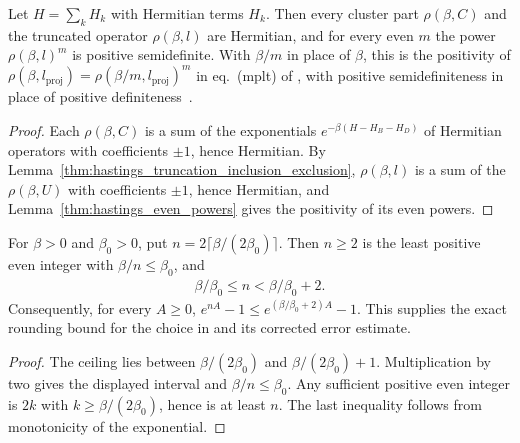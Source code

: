 \begin{lemma}
    \label{thm:hastings_truncated_positivity}
    \leanok
    Let $H=\sum_kH_k$ with Hermitian terms $H_k$. Then every cluster part
    $\rho(\beta,C)$ and the truncated operator $\rho(\beta,l)$ are Hermitian, and
    for every even $m$ the power $\rho(\beta,l)^m$ is positive semidefinite. With
    $\beta/m$ in place of $\beta$, this is the positivity of
    $\rho(\beta,l_{\mathrm{proj}})=\rho(\beta/m,l_{\mathrm{proj}})^m$ in
    eq.~(mplt) of \cite[lines 1303--1314]{Hastings2006Solving}, with positive
    semidefiniteness in place of positive
    definiteness~\cite{gap:hastings05_mplt_positivity}.
\end{lemma}
\begin{proof}\leanok
    Each $\rho(\beta,C)$ is a sum of the exponentials $e^{-\beta(H-H_B-H_D)}$ of
    Hermitian operators with coefficients $\pm1$, hence Hermitian. By
    Lemma~\ref{thm:hastings_truncation_inclusion_exclusion}, $\rho(\beta,l)$ is a
    sum of the $\rho(\beta,U)$ with coefficients $\pm1$, hence Hermitian, and
    Lemma~\ref{thm:hastings_even_powers} gives the positivity of
    its even powers.
\end{proof}

\begin{lemma}
    \label{thm:hastings_even_temperature_factors}
    \leanok
    For $\beta>0$ and $\beta_0>0$, put
    $n=2\lceil\beta/(2\beta_0)\rceil$. Then $n\ge2$ is the least
    positive even integer with $\beta/n\le\beta_0$, and
    \begin{align*}
        \beta/\beta_0\le n<\beta/\beta_0+2.
    \end{align*}
    Consequently, for every $A\ge0$,
    $e^{nA}-1\le e^{(\beta/\beta_0+2)A}-1$.
    This supplies the exact rounding bound for the choice in
    \cite[lines 1307--1312]{Hastings2006Solving} and its corrected
    error estimate\cite{gap:hastings05_temperature_factor_count}.
\end{lemma}
\begin{proof}\leanok
    The ceiling lies between $\beta/(2\beta_0)$ and
    $\beta/(2\beta_0)+1$. Multiplication by two gives the displayed
    interval and $\beta/n\le\beta_0$. Any sufficient positive even
    integer is $2k$ with $k\ge\beta/(2\beta_0)$, hence is at least $n$.
    The last inequality follows from monotonicity of the exponential.
\end{proof}

